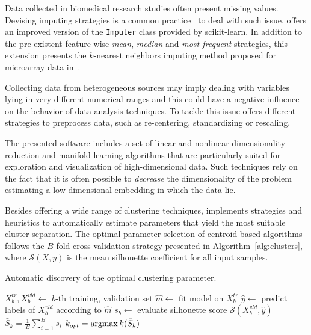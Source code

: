 Data collected in biomedical research studies often present missing values.
Devising imputing strategies is a common practice~\cite{de2015impact} to deal with such issue.
\ade offers an improved version of the {\footnotesize \texttt{Imputer}} class provided by {\sc scikit-learn}. In addition to the pre-existent feature-wise \emph{mean}, \emph{median} and \emph{most frequent} strategies, this extension presents the $k$-nearest neighbors imputing method proposed for microarray data in~\cite{troyanskaya2001missing}.

Collecting data from heterogeneous sources may imply dealing with variables lying in very different numerical ranges and this could have a negative influence on the behavior of data analysis techniques. To tackle this issue \ade offers different strategies to preprocess data, such as re-centering, standardizing or rescaling.

The presented software includes a set of linear and nonlinear dimensionality reduction and manifold learning algorithms that are particularly suited for exploration and visualization of high-dimensional data. Such techniques rely on the fact that it is often possible to \emph{decrease} the dimensionality of the problem estimating a low-dimensional embedding in which the data lie.

Besides offering a wide range of clustering techniques,
\ade implements strategies and heuristics to automatically estimate parameters that yield the most suitable cluster separation.
The optimal parameter selection of centroid-based algorithms follows the $B$-fold cross-validation strategy presented in Algorithm~\ref{alg:clusters}, where $\mathcal{S}(X,y)$ is the mean silhouette coefficient \cite{rousseeuw1987silhouettes} for all input samples.

\begin{algorithm}[]
  \caption{Automatic discovery of the optimal clustering parameter.}\label{alg:clusters}
    \begin{algorithmic}[1]
              \State $X^{tr}_b,X^{vld}_b\leftarrow$ $b$-th training, validation set
              \State $\hat{m}\leftarrow$ fit model on $X^{tr}_b$
              \State $\hat{y}\leftarrow$ predict labels of $X^{vld}_b$ according to $\hat{m}$
              \State $s_b\leftarrow$ evaluate silhouette score  $\mathcal{S}(X^{vld}_b,\hat{y})$
        \EndFor
        \State $\bar{S}_k = \frac{1}{B}\sum_{i=1}^B s_i$
        \EndFor
        \State $k_{opt} = \mathop{\mathrm{argmax}}\limits{k}(\bar{S}_k)$
    \end{algorithmic}
\end{algorithm}

